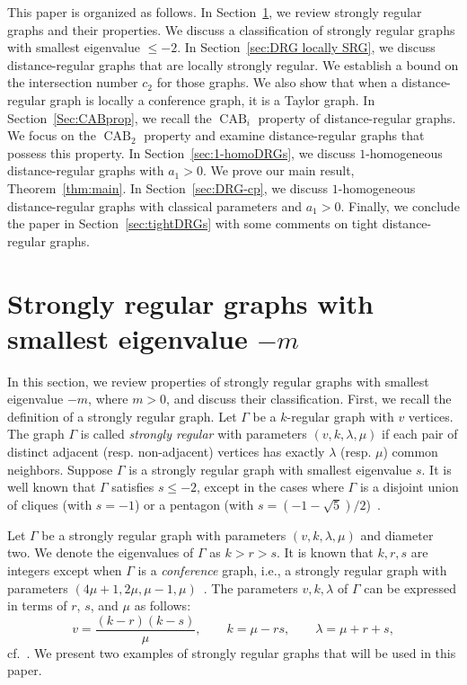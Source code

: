 This paper is organized as follows.
In Section~\ref{sec:SRG}, we review strongly regular graphs and their properties. 
We discuss a classification of strongly regular graphs with smallest eigenvalue $\leqslant -2$.
In Section~\ref{sec:DRG locally SRG}, we discuss distance-regular graphs that are locally strongly regular. 
We establish a bound on the intersection number $c_2$ for those graphs. 
We also show that when a distance-regular graph is locally a conference graph, it is a Taylor graph.
In Section~\ref{Sec:CABprop}, we recall the $\operatorname{CAB}_i$ property of distance-regular graphs. 
We focus on the $\operatorname{CAB}_2$ property and examine distance-regular graphs that possess this property.
In Section~\ref{sec:1-homoDRGs}, we discuss $1$-homogeneous distance-regular graphs with $a_1 > 0$. 
We prove our main result, Theorem~\ref{thm:main}.
In Section~\ref{sec:DRG-cp}, we discuss $1$-homogeneous distance-regular graphs with classical parameters and $a_1 > 0$.
Finally, we conclude the paper in Section~\ref{sec:tightDRGs} with some comments on tight distance-regular graphs. 


\section{Strongly regular graphs with smallest eigenvalue \texorpdfstring{$-m$}{-m}}\label{sec:SRG}
In this section, we review properties of strongly regular graphs with smallest eigenvalue $-m$, where $m > 0$, and discuss their classification.
First, we recall the definition of a strongly regular graph.
Let $\Gamma$ be a $k$-regular graph with $v$ vertices. 
The graph $\Gamma$ is called \emph{strongly regular} with parameters $(v,k,\lambda, \mu)$ if each pair of distinct adjacent (resp. non-adjacent) vertices has exactly $\lambda$ (resp. $\mu$) common neighbors. 
Suppose $\Gamma$ is a strongly regular graph with smallest eigenvalue $s$. 
It is well known that $\Gamma$ satisfies $s \leqslant -2$, except in the cases where $\Gamma$ is a disjoint union of cliques (with $s = -1$) or a pentagon (with $s = (-1 - \sqrt{5})/{2}$)~\cite[Section 1.1.10]{BrVM2022}.

Let $\Gamma$ be a strongly regular graph with parameters $(v,k,\lambda,\mu)$ and diameter two.
We denote the eigenvalues of $\Gamma$ as $k>r>s$. 
It is known that $k,r,s$ are integers except when $\Gamma$ is a \emph{conference} graph, i.e., a strongly regular graph with parameters $(4\mu +1, 2\mu, \mu-1,\mu)$~\cite[Lemma 10.3.3]{GR01}. 
The parameters $v, k, \lambda$ of $\Gamma$ can be expressed in terms of $r$, $s$, and $\mu$ as follows:
\begin{equation}\label{SRG parameters}
	  v = \frac{(k-r)(k-s)}{\mu}, \qquad 
	  k= \mu -rs, \qquad 
	  \lambda = \mu +r +s,
\end{equation}
cf.~\cite[Theorem 1.3.1]{BCN}.
We present two examples of strongly regular graphs that will be used in this paper.

